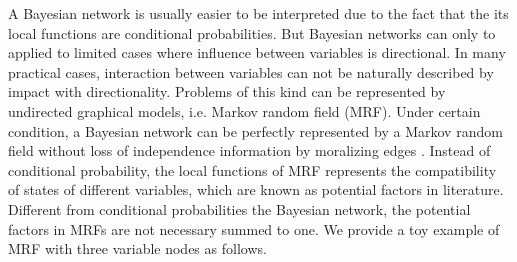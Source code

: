 A Bayesian network is usually easier to be interpreted due to the fact that the its local functions are conditional probabilities. But Bayesian networks can only to applied to limited cases where influence between variables is directional. In many practical cases, interaction between variables can not be naturally described by impact with directionality. Problems of this kind can be represented by undirected graphical models, i.e. Markov random field (MRF). Under certain condition, a Bayesian network can be perfectly represented by a Markov random field without loss of independence information by moralizing edges \cite[Chapter~4.5]{koller2009pgm}. Instead of conditional probability, the local functions of MRF represents the compatibility of states of different variables, which are known as potential factors in literature. Different from conditional probabilities the Bayesian network, the potential factors in MRFs are not necessary summed to one. We provide a toy example of MRF with three variable nodes as follows.
